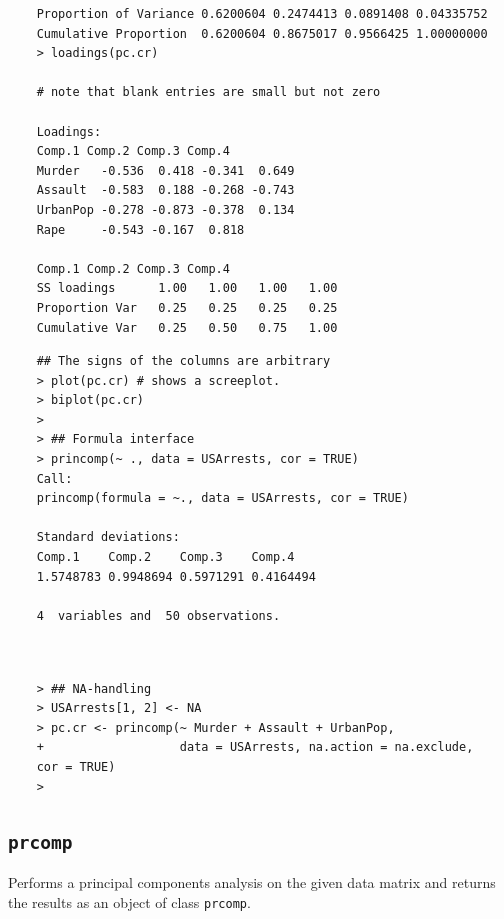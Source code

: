 \documentclass[]{article}
\begin{document}
\[ \mbox{ } \]

\newpage

\begin{framed}
	\begin{verbatim}
	Proportion of Variance 0.6200604 0.2474413 0.0891408 0.04335752
	Cumulative Proportion  0.6200604 0.8675017 0.9566425 1.00000000
	> loadings(pc.cr)  
	
	# note that blank entries are small but not zero
	
	Loadings:
	Comp.1 Comp.2 Comp.3 Comp.4
	Murder   -0.536  0.418 -0.341  0.649
	Assault  -0.583  0.188 -0.268 -0.743
	UrbanPop -0.278 -0.873 -0.378  0.134
	Rape     -0.543 -0.167  0.818       
	
	Comp.1 Comp.2 Comp.3 Comp.4
	SS loadings      1.00   1.00   1.00   1.00
	Proportion Var   0.25   0.25   0.25   0.25
	Cumulative Var   0.25   0.50   0.75   1.00
	\end{verbatim}
\end{framed}
\newpage
\begin{framed}
	\begin{verbatim}
	## The signs of the columns are arbitrary
	> plot(pc.cr) # shows a screeplot.
	> biplot(pc.cr)
	> 
	> ## Formula interface
	> princomp(~ ., data = USArrests, cor = TRUE)
	Call:
	princomp(formula = ~., data = USArrests, cor = TRUE)
	
	Standard deviations:
	Comp.1    Comp.2    Comp.3    Comp.4 
	1.5748783 0.9948694 0.5971291 0.4164494 
	
	4  variables and  50 observations.
	
	
	\end{verbatim}
\end{framed}
\newpage
\begin{framed}
	\begin{verbatim}
	> ## NA-handling
	> USArrests[1, 2] <- NA
	> pc.cr <- princomp(~ Murder + Assault + UrbanPop,
	+                   data = USArrests, na.action = na.exclude, 
	cor = TRUE)
	> 
	\end{verbatim}
\end{framed}
\subsection*{\texttt{prcomp}}
Performs a principal components analysis on the given data matrix and returns the results as an object of class \texttt{prcomp}.
\end{document}
